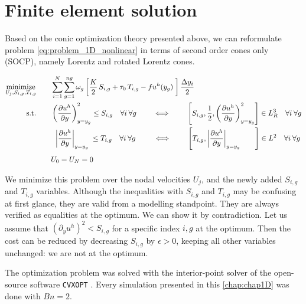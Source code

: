 \documentclass[11 pt]{report}
\begin{document}
\section{Finite element solution}
\label{sec:fem_1D}
Based on the conic optimization theory presented above, we can reformulate problem \eqref{eq:problem_1D_nonlinear} in terms of second order cones only (SOCP), namely Lorentz and rotated Lorentz cones.
\begin{empheqboxed}
    \begin{align}
            \operatorname*{minimize}_{U_j, S_{i, g}, T_{i, g}} \qquad &\sum_{i=1}^N \sum_{g=1}^{ng} \omega_{g} \left[\frac{K}{2} \, S_{i, g} + \tau_0 \, T_{i,g} - f u^h(y_g) \; \right] \frac{\Delta y_i}{2} \label{eq:problem_1D}\\
            \textrm{s.t.} \qquad & \left(\pdv{u^h}{y}\right)^2_{y=y_g} \leq S_{i,g} \quad \forall i \:\forall g \qquad \iff \qquad \left[S_{i,g}, \frac{1}{2}, \left(\pdv{u^h}{y}\right)^2_{y=y_g}\right] \in L_R^{3} \quad \forall i \:\forall g \nonumber\\
            \qquad &\;\, \left|\pdv{u^h}{y}\right|_{y=y_g} \;\leq T_{i,g} \quad \forall i \:\forall g \qquad\, \iff \qquad \left[ T_{i,g}, \left|\pdv{u^h}{y}\right|_{y=y_g} \qquad\right] \in L^{2} \quad \forall i \:\forall g \nonumber\\[4pt]
            \qquad & U_0 = U_N = 0 \nonumber
    \end{align}
\end{empheqboxed}

We minimize this problem over the nodal velocities $U_j$, and the newly added $S_{i,g}$ and $T_{i,g}$ variables. Although the inequalities with $S_{i,g}$ and $T_{i,g}$ may be confusing at first glance, they are valid from a modelling standpoint. They are always verified as equalities at the optimum. We can show it by contradiction. Let us assume that $(\partial_y u^h)^2 < S_{i,g}$ for a specific index $i,g$ at the optimum. Then the cost can be reduced by decreasing $S_{i,g}$ by $\epsilon > 0$, keeping all other variables unchanged: we are not at the optimum. %

The optimization problem was solved with the interior-point solver of the open-source software \texttt{CVXOPT} \cite{cvxopt}. Every simulation presented in this \cref{chap:chap1D} was done with $Bn=2$.
\end{document}
